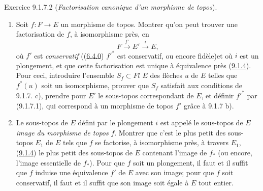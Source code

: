 \documentclass[10pt]{../fichiers-configuration-latex/smfart}
\begin{document}
\begin{enonce*}[remark]{Exercice 9.1.7.2}
(\emph{Factorisation canonique d'un morphisme de topos}).
\begin{enumerate}
\renewcommand{\theenumi}{\alph{enumi}}
\renewcommand{\labelenumi}{\theenumi)}
\item Soit $f:F\longrightarrow E$
un morphisme de topos. Montrer qu'on peut trouver une factorisation
de $f$, à isomorphisme près, en
\begin{equation*}
F\xrightarrow{f'}E'\xrightarrow{i} E,\tag{9.1.7.3}
\end{equation*}
où $f'$ est \emph{conservatif} (\ie (\hyperref[IV.subsubsec6.4.0]{6.4.0})
${f'}^{\ast}$ est conservatif, ou encore fidèle)\pageoriginale et où
$i$ est un plongement, et que cette factorisation est unique à
équivalence près (\cf \hyperref[IV.prop9.1.4]{9.1.4}). Pour ceci, introduire
l'ensemble $S_f\subset Fl$ $E$ des flèches $u$ de $E$ telles que
$f^{\ast}(u)$ soit un isomorphisme, prouver que $S_f$ satisfait aux
conditions de 9.1.7. c), prendre pour $E'$ le sous-topos
correspondant de $E$, et définir ${f'}^{\ast}$ par (9.1.7.1), qui
correspond à un morphisme de topos $f'$ grâce à 9.1.7 b).

\item Le sous-topos de $E$ défini par le plongement $i$ est appelé le
sous-topos de $E$ \emph{image du morphisme de topos} $f$. Montrer
que c'est le plus petit des sous-topos $E_1$ de $E$ tels que $f$ se
factorise, à isomorphisme près, à travers $E_1$, \ie
(\hyperref[IV.prop9.1.4]{9.1.4}) le plus petit des sous-topos de $E$ contenant
l'image de $f_{\ast}$ (ou encore, l'image essentielle de
$f_{\ast}$). Pour que $f$ soit un plongement, il faut et il suffit
que $f$ induise une équivalence $f'$ de $E$ avec son image; pour que
$f$ soit conservatif, il faut et il suffit que son image soit égale
à $E$ tout entier.


\end{enumerate}
\end{enonce*}
\end{document}
